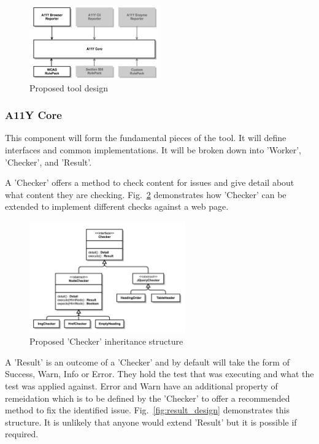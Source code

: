 \begin{figure}[H]
\centering
\includegraphics[width=0.5\textwidth]{figures/a11y_tool_proposed_design}
\captionsetup{justification=centering}
\caption{Proposed tool design
\label{fig:tool_proposed_design}}
\end{figure}

\subsubsection{A11Y Core}
This component will form the fundamental pieces of the tool. It will define
interfaces and common implementations. It will be broken down into 'Worker',
'Checker', and 'Result'.

A 'Checker' offers a method to check content for issues and give detail
about what content they are checking. Fig.~\ref{fig:checker_design} demonstrates
how 'Checker' can be extended to implement different checks against a web page.

\begin{figure}[H]
\centering
\includegraphics[width=0.6\textwidth]{figures/a11y_tool_checkers}
\captionsetup{justification=centering}
\caption{Proposed 'Checker' inheritance structure
\label{fig:checker_design}}
\end{figure}

A 'Result' is an outcome of a 'Checker' and by default will take the form of
Success, Warn, Info or Error. They hold the test that was executing and
what the test was applied against. Error and Warn have an additional property of
remeidation which is to be defined by the 'Checker' to offer a recommended
method to fix the identified issue. Fig.~\ref{fig:result_design} demonstrates
this structure. It is unlikely that anyone would extend 'Result' but it is
possible if required.

